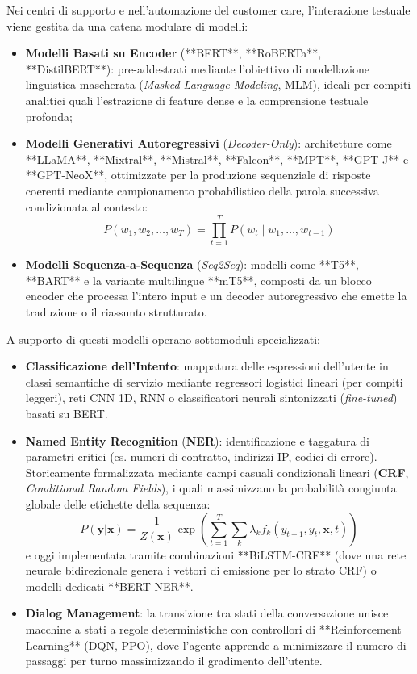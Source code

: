 \documentclass[11pt, a4paper]{article}
\begin{document}
Nei centri di supporto e nell'automazione del customer care, l'interazione testuale viene gestita da una catena modulare di modelli:
\begin{itemize}
    \item \textbf{Modelli Basati su Encoder} (**BERT**, **RoBERTa**, **DistilBERT**): pre-addestrati mediante l'obiettivo di modellazione linguistica mascherata (\emph{Masked Language Modeling}, MLM), ideali per compiti analitici quali l'estrazione di feature dense e la comprensione testuale profonda;
    \item \textbf{Modelli Generativi Autoregressivi} (\emph{Decoder-Only}): architetture come **LLaMA**, **Mixtral**, **Mistral**, **Falcon**, **MPT**, **GPT-J** e **GPT-NeoX**, ottimizzate per la produzione sequenziale di risposte coerenti mediante campionamento probabilistico della parola successiva condizionata al contesto:
    \begin{equation}
        P(w_1, w_2, \dots, w_T) = \prod_{t=1}^T P(w_t \mid w_1, \dots, w_{t-1})
    \end{equation}
    \item \textbf{Modelli Sequenza-a-Sequenza} (\emph{Seq2Seq}): modelli come **T5**, **BART** e la variante multilingue **mT5**, composti da un blocco encoder che processa l'intero input e un decoder autoregressivo che emette la traduzione o il riassunto strutturato.
\end{itemize}

A supporto di questi modelli operano sottomoduli specializzati:
\begin{itemize}
    \item \textbf{Classificazione dell'Intento}: mappatura delle espressioni dell'utente in classi semantiche di servizio mediante regressori logistici lineari (per compiti leggeri), reti CNN 1D, RNN o classificatori neurali sintonizzati (\emph{fine-tuned}) basati su BERT.
    \item \textbf{Named Entity Recognition} (\textbf{NER}): identificazione e taggatura di parametri critici (es. numeri di contratto, indirizzi IP, codici di errore). Storicamente formalizzata mediante campi casuali condizionali lineari (\textbf{CRF}, \emph{Conditional Random Fields}), i quali massimizzano la probabilità congiunta globale delle etichette della sequenza:
    \begin{equation}
        P(\bm{y}|\bm{x}) = \frac{1}{Z(\bm{x})} \exp\left( \sum_{t=1}^T \sum_{k} \lambda_k f_k(y_{t-1}, y_t, \bm{x}, t) \right)
    \end{equation}
    e oggi implementata tramite combinazioni **BiLSTM-CRF** (dove una rete neurale bidirezionale genera i vettori di emissione per lo strato CRF) o modelli dedicati **BERT-NER**.
    \item \textbf{Dialog Management}: la transizione tra stati della conversazione unisce macchine a stati a regole deterministiche con controllori di **Reinforcement Learning** (DQN, PPO), dove l'agente apprende a minimizzare il numero di passaggi per turno massimizzando il gradimento dell'utente.
\end{itemize}
\end{document}
